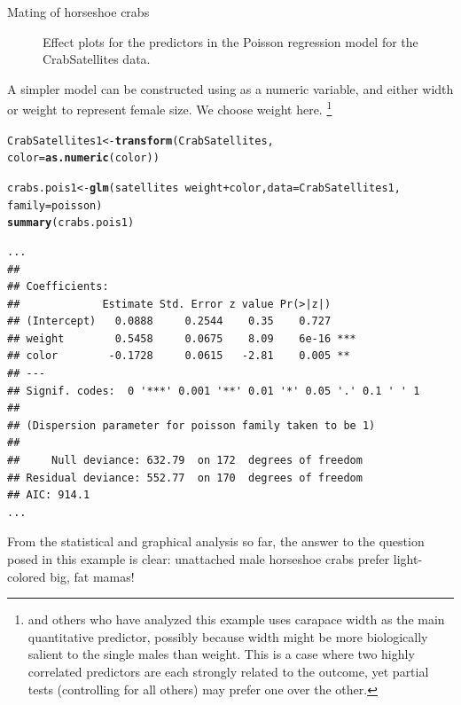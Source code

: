 \documentclass[11pt]{book}\usepackage[]{graphicx}\usepackage[]{color}
\makeatletter
\newcommand{\hlopt}[1]{\textcolor[rgb]{0,0,0}{#1}}%
\newcommand{\hlstd}[1]{\textcolor[rgb]{0.345,0.345,0.345}{#1}}%
\newcommand{\hlkwb}[1]{\textcolor[rgb]{0.69,0.353,0.396}{#1}}%
\newcommand{\hlkwc}[1]{\textcolor[rgb]{0.333,0.667,0.333}{#1}}%
\newcommand{\hlkwd}[1]{\textcolor[rgb]{0.737,0.353,0.396}{\textbf{#1}}}%
\newenvironment{kframe}{%
 \def\at@end@of@kframe{}%
 \ifinner\ifhmode%
  \def\at@end@of@kframe{\end{minipage}}%
  \begin{minipage}{\columnwidth}%
 \fi\fi%
 \def\FrameCommand##1{\hskip\@totalleftmargin \hskip-\fboxsep
 \colorbox{shadecolor}{##1}\hskip-\fboxsep
     \hskip-\linewidth \hskip-\@totalleftmargin \hskip\columnwidth}%
 \MakeFramed {\advance\hsize-\width
   \@totalleftmargin\z@ \linewidth\hsize
   \@setminipage}}%
 {\par\unskip\endMakeFramed%
 \at@end@of@kframe}
\newenvironment{knitrout}{}{} %
\renewenvironment{knitrout}{\small\renewcommand{\baselinestretch}{.85}}{} %
\makeatother
\begin{document}
\begin{Example}[crabs1]{Mating of horseshoe crabs}
\begin{knitrout}
\begin{figure}[!htbp]
\caption[Effect plots for the predictors in the Poisson regression model for the CrabSatellites data]{Effect plots for the predictors in the Poisson regression model for the CrabSatellites data.\label{fig:crabs1-eff1}}
\end{figure}


\end{knitrout}

A simpler model can be constructed using  as a numeric variable, and either width or
weight to represent female size. We choose weight here.%
\footnote{
\citet[\S 4.3]{Agresti:2013} and others who have analyzed this example uses carapace width
as the main quantitative predictor, possibly because width might be more biologically salient
to the single males than weight.  This is a case where two
highly correlated predictors are each strongly related to the outcome,
yet partial tests (controlling for all others) may prefer one over the other.
}

\begin{knitrout}
\color{fgcolor}\begin{kframe}
\begin{alltt}
\hlstd{CrabSatellites1} \hlkwb{<-} \hlkwd{transform}\hlstd{(CrabSatellites,}
  \hlkwc{color} \hlstd{=} \hlkwd{as.numeric}\hlstd{(color))}

\hlstd{crabs.pois1} \hlkwb{<-} \hlkwd{glm}\hlstd{(satellites} \hlopt{~} \hlstd{weight} \hlopt{+} \hlstd{color,} \hlkwc{data}\hlstd{=CrabSatellites1,}
                   \hlkwc{family}\hlstd{=poisson)}
\hlkwd{summary}\hlstd{(crabs.pois1)}
\end{alltt}
\begin{verbatim}
...
## 
## Coefficients:
##             Estimate Std. Error z value Pr(>|z|)    
## (Intercept)   0.0888     0.2544    0.35    0.727    
## weight        0.5458     0.0675    8.09    6e-16 ***
## color        -0.1728     0.0615   -2.81    0.005 ** 
## ---
## Signif. codes:  0 '***' 0.001 '**' 0.01 '*' 0.05 '.' 0.1 ' ' 1
## 
## (Dispersion parameter for poisson family taken to be 1)
## 
##     Null deviance: 632.79  on 172  degrees of freedom
## Residual deviance: 552.77  on 170  degrees of freedom
## AIC: 914.1
...
\end{verbatim}
\end{kframe}
\end{knitrout}

From the statistical and graphical analysis so far, the answer to the question posed
in this example is clear:  unattached male horseshoe crabs prefer light-colored
big, fat mamas!


\end{Example}
\end{document}
